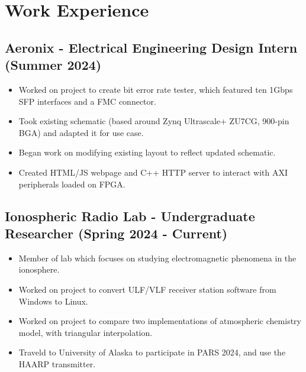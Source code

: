 \documentclass{article}
\newcommand{\sectionspacing}{\vspace{-0em}} %
\newenvironment{CustomItemize}
{ \begin{itemize}[leftmargin=1em]
    \setlength{\itemsep}{0pt}
    \setlength{\parskip}{0pt}
    \setlength{\parindent}{0pt}
    \setlength{\parsep}{0pt}     }
{ \end{itemize}                  }
\begin{document}

\sectionspacing{}

\section{Work Experience}
\subsection{Aeronix - Electrical Engineering Design Intern (Summer 2024)}
\begin{CustomItemize}
\item Worked on project to create bit error rate tester, which featured ten 1Gbps SFP interfaces and a FMC connector.
\item Took existing schematic (based around Zynq Ultrascale+ ZU7CG, 900-pin BGA) and adapted it for use case.
\item Began work on modifying existing layout to reflect updated schematic.
\item Created HTML/JS webpage and C++ HTTP server to interact with AXI peripherals loaded on FPGA.
\end{CustomItemize}

\subsection{Ionospheric Radio Lab - Undergraduate Researcher (Spring 2024 - Current)}
\begin{CustomItemize}
\item Member of lab which focuses on studying electromagnetic phenomena in the ionosphere.
\item Worked on project to convert ULF/VLF receiver station software from Windows to Linux.
\item Worked on project to compare two implementations of atmospheric chemistry model, with triangular interpolation.
\item Traveld to University of Alaska to participate in PARS 2024, and use the HAARP transmitter.
\end{CustomItemize}
\end{document}
